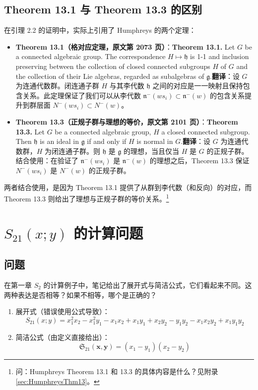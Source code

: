 \subsection{Theorem 13.1 与 Theorem 13.3 的区别}在引理 2.2 的证明中，实际上引用了 Humphreys 的两个定理：
\begin{itemize}
\item \textbf{Theorem 13.1（格对应定理，原文第 2073 页）}：\textbf{Theorem 13.1.} Let $G$ be a connected algebraic group. The correspondence $H \mapsto \mathfrak{h}$ is 1-1 and inclusion preserving between the collection of closed connected subgroups $H$ of $G$ and the collection of their Lie algebras, regarded as subalgebras of $\mathfrak{g}$.\textbf{翻译}：设 $G$ 为连通代数群。闭连通子群 $H$ 与其李代数 $\mathfrak{h}$ 之间的对应是一一映射且保持包含关系。此定理保证了我们可以从李代数 $\mathfrak{n}^-(ws_i) \subset \mathfrak{n}^-(w)$ 的包含关系提升到群层面 $N^-(ws_i) \subset N^-(w)$。\item \textbf{Theorem 13.3（正规子群与理想的等价，原文第 2101 页）}：\textbf{Theorem 13.3.} Let $G$ be a connected algebraic group, $H$ a closed connected subgroup. Then $\mathfrak{h}$ is an ideal in $\mathfrak{g}$ if and only if $H$ is normal in $G$.\textbf{翻译}：设 $G$ 为连通代数群，$H$ 为闭连通子群。则 $\mathfrak{h}$ 是 $\mathfrak{g}$ 的理想，当且仅当 $H$ 是 $G$ 的正规子群。结合使用：在验证了 $\mathfrak{n}^-(ws_i)$ 是 $\mathfrak{n}^-(w)$ 的理想之后，Theorem 13.3 保证 $N^-(ws_i)$ 是 $N^-(w)$ 的正规子群。
\end{itemize}两者结合使用，是因为 Theorem 13.1 提供了从群到李代数（和反向）的对应，而 Theorem 13.3 则给出了理想与正规子群的等价关系。\footnote{问：Humphreys Theorem 13.1 和 13.3 的具体内容是什么？见附录 \cref{sec:HumphreysThm13}。}
\section{$S_{21}(x; y)$ 的计算问题}\label{sec:S21Calculation}
\subsection{问题}
在第一章 $S_2$ 的计算例子中，笔记给出了展开式与简洁公式，它们看起来不同。这两种表达是否相等？如果不相等，哪个是正确的？
\begin{enumerate}
\item 展开式（错误使用公式导致）：$$S_{21}(x; y) = x_1^2 x_2 - x_1^2 y_1 - x_1 x_2 + x_1 y_1 + x_2 y_2 - y_1 y_2 - x_1 x_2 y_2 + x_1 y_1 y_2$$\item 简洁公式（由定义直接给出）：$$\mathfrak{S}_{21}(\mathbf{x},\mathbf{y}) = (x_1 - y_1)(x_2 - y_2)$$
\end{enumerate}
